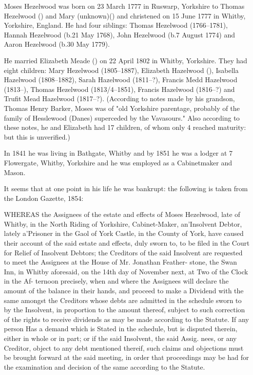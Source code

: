 
Moses Hezelwood was born on 23 March 1777 in 	Ruswarp, Yorkshire to Thomas Hezelwood () and Mary (unknown)() and christened on 15 June 1777 in	Whitby, Yorkshire, England.\cite{MHezelwoodBirth} He had four siblings: Thomas Hezelwood (1766--1781), Hannah Hezelwood (b.21 May 1768), John Hezelwood (b.7 August 1774) and Aaron Hezelwood (b.30 May 1779).

He married Elizabeth Meade () on 22 April 1802 in	Whitby, Yorkshire.\cite{MHezelwoodMarriage}  They had eight children: Mary Hezelwood (1805--1887), Elizabeth Hazelwood (), Isabella Hazelwood (1808--1882), Sarah Hazelwood (1811--?), Francis Medd Hazelwood (1813--), Thomas Hezelwood (1813/4--1851),
Francis Hazelwood (1816--?) and Trufit Mead Hazelwood (1817--?). (According to notes made by his grandson, Thomas Henry Barker, Moses  was of "old Yorkshire parentage, probably of the family of Hesslewood (Danes) superceded by the Vavasours." Also according to these notes, he and Elizabeth had 17 children, of whom only 4 reached maturity: but this is unverified.)

In 1841 he was living in Bathgate, Whitby \cite{MHezelwood1841} and by 1851 he was a lodger at 7 Flowergate,	Whitby, Yorkshire and he was employed as a Cabinetmaker and Mason.\cite{MHezelwood1851}

It seems that at one point in his life he was bankrupt: the following is taken from the London Gazette, 1854:

WHEREAS the Assignees of the estate and effects of Moses Hezelwood, late of Whitby, in the North Riding of Yorkshire, Cabinet-Maker, an'Insolvent Debtor, lately a'Prisoner in the Gaol of York Castle, in the County of York, have caused their account of the said estate and effects, duly sworn to, to be filed in the Court for Relief of Insolvent Debtors; the Creditors of the said Insolvent are requested to meet the Assignees at the House of Mr. Jonathan Feather- stone, the Swan Inn, in Whitby aforesaid, on the 14th day of November next, at Two of the Clock in the Af- ternoon precisely, when and where the Assignees will declare the amount of the balance in their hands, and proceed to make a Dividend with the same amongst the Creditors whose debts are admitted in the schedule sworn to by the Insolvent, in proportion to the amount thereof, subject to such correction of the rights to receive dividends as may be made according to the Statute. If any person Has a demand which is Stated in the schedule, but is disputed therein, either in whole or in part; or if the said Insolvent, the said Assig. nees, or any Creditor, object to any debt mentioned thereif, such claims and objections must be brought forward at the said meeting, in order that proceedings may be had for the examination and decision of the same according to the Statute.

